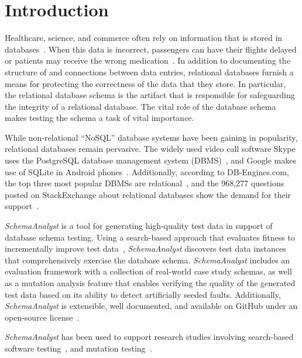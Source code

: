 \section{Introduction}\label{sec:intro}

Healthcare, science, and commerce often rely on information that is stored in
databases~\cite{kapfhammer2007comprehensive}.  When this data is incorrect, passengers can have their flights delayed or
patients may receive the wrong medication~\cite{databasebook}.  In addition to documenting the structure of and
connections between data entries, relational databases furnish a means for protecting the correctness of the data that
they store.  In particular, the relational database schema is the artifact that is responsible for safeguarding the
integrity of a relational database. The vital role of the database schema makes testing the schema a task of vital
importance.

While non-relational ``NoSQL'' database systems have been gaining in popularity, relational databases remain pervasive.
The widely used video call software Skype uses the PostgreSQL database management system (DBMS)~\cite{postgres}, and
Google makes use of SQLite in Android phones~\cite{sqlite}.  Additionally, according to DB-Engines.com, the top three
most popular DBMSs are relational~\cite{dbrank}, and the 968,277 questions posted on StackExchange about relational
databases show the demand for their support~\cite{stackexchange}.

\textit{SchemaAnalyst} is a tool for generating high-quality test data in support of database schema testing. Using a
search-based approach that evaluates fitness to incrementally improve test data~\cite{Korel:AVM}, \textit{SchemaAnalyst}
discovers test data instances that comprehensively exercise the database schema.  \textit{SchemaAnalyst} includes an
evaluation framework with a collection of real-world case study schemas, as well as a mutation analysis feature that
enables verifying the quality of the generated test data based on its ability to detect artificially seeded faults.
Additionally, \textit{SchemaAnalyst} is extensible, well documented, and available on GitHub under an open-source
license~\cite{tool}.

\textit{SchemaAnalyst} has been used to support research studies involving search-based software
testing~\cite{kapfhammer2013search,mcminn2015effectiveness,kinneer2015automatically}, and mutation
testing~\cite{wright2013efficient,wright2014impact,wright2015mutation,mcminn2016virtual}.

